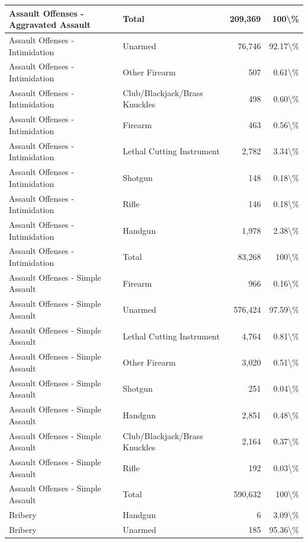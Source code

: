 \documentclass[
]{krantz}
\begin{document}
\begin{longtable}[t]{l|l|r|r}
\hline
Assault Offenses - Aggravated Assault & Total & 209,369 & 100\textbackslash{}\%\\
\hline
Assault Offenses - Intimidation & Unarmed & 76,746 & 92.17\textbackslash{}\%\\
\hline
Assault Offenses - Intimidation & Other Firearm & 507 & 0.61\textbackslash{}\%\\
\hline
Assault Offenses - Intimidation & Club/Blackjack/Brass Knuckles & 498 & 0.60\textbackslash{}\%\\
\hline
Assault Offenses - Intimidation & Firearm & 463 & 0.56\textbackslash{}\%\\
\hline
Assault Offenses - Intimidation & Lethal Cutting Instrument & 2,782 & 3.34\textbackslash{}\%\\
\hline
Assault Offenses - Intimidation & Shotgun & 148 & 0.18\textbackslash{}\%\\
\hline
Assault Offenses - Intimidation & Rifle & 146 & 0.18\textbackslash{}\%\\
\hline
Assault Offenses - Intimidation & Handgun & 1,978 & 2.38\textbackslash{}\%\\
\hline
Assault Offenses - Intimidation & Total & 83,268 & 100\textbackslash{}\%\\
\hline
Assault Offenses - Simple Assault & Firearm & 966 & 0.16\textbackslash{}\%\\
\hline
Assault Offenses - Simple Assault & Unarmed & 576,424 & 97.59\textbackslash{}\%\\
\hline
Assault Offenses - Simple Assault & Lethal Cutting Instrument & 4,764 & 0.81\textbackslash{}\%\\
\hline
Assault Offenses - Simple Assault & Other Firearm & 3,020 & 0.51\textbackslash{}\%\\
\hline
Assault Offenses - Simple Assault & Shotgun & 251 & 0.04\textbackslash{}\%\\
\hline
Assault Offenses - Simple Assault & Handgun & 2,851 & 0.48\textbackslash{}\%\\
\hline
Assault Offenses - Simple Assault & Club/Blackjack/Brass Knuckles & 2,164 & 0.37\textbackslash{}\%\\
\hline
Assault Offenses - Simple Assault & Rifle & 192 & 0.03\textbackslash{}\%\\
\hline
Assault Offenses - Simple Assault & Total & 590,632 & 100\textbackslash{}\%\\
\hline
Bribery & Handgun & 6 & 3.09\textbackslash{}\%\\
\hline
Bribery & Unarmed & 185 & 95.36\textbackslash{}\%\\

\end{longtable}
\end{document}
